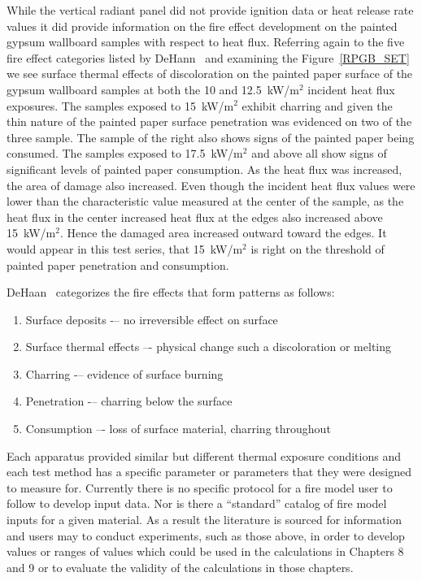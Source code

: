 \documentclass[twoside]{uocthesis}
\begin{document}
While the vertical radiant panel did not provide ignition data or heat release rate values it did provide information on the fire effect development on the painted gypsum wallboard samples with respect to heat flux.  Referring again to the five fire effect categories listed by DeHann~\cite{DeHaan:2012} and examining the Figure~\ref{RPGB_SET} we see surface thermal effects of discoloration on the painted paper surface of the gypsum wallboard samples at both the 10 and 12.5~kW/m$^2$ incident heat flux exposures.  The samples exposed to 15~kW/m$^2$ exhibit charring and given the thin nature of the painted paper surface penetration was evidenced on two of the three sample.  The sample of the right also shows signs of the painted paper being consumed.  The samples exposed to 17.5~kW/m$^2$ and above all show signs of significant levels of painted paper consumption.  As the heat flux was increased, the area of damage also increased. Even though the incident heat flux values were lower than the characteristic value measured at the center of the sample, as the heat flux in the center increased heat flux at the edges also increased above 15~kW/m$^2$. Hence the damaged area increased outward toward the edges. It would appear in this test series, that 15~kW/m$^2$ is right on the threshold of painted paper penetration and consumption.             


DeHaan~\cite{DeHaan:2012} categorizes the fire effects that form patterns as follows:
\begin{enumerate}
	\item Surface deposits -– no irreversible effect on surface
	\item Surface thermal effects –- physical change such a discoloration or melting
	\item Charring -– evidence of surface burning
	\item Penetration -– charring below the surface
	\item Consumption –- loss of surface material, charring throughout
\end{enumerate}

Each apparatus provided similar but different thermal exposure conditions and each test method has a specific parameter or parameters that they were designed to measure for. Currently there is no specific protocol for a fire model user to follow to develop input data.  Nor is there a ``standard'' catalog of fire model inputs for a given material.  As a result the literature is sourced for information and users may to conduct experiments, such as those above, in order to develop values or ranges of values which could be used in the calculations in Chapters 8 and 9 or to evaluate the validity of the calculations in those chapters.     
\end{document}
